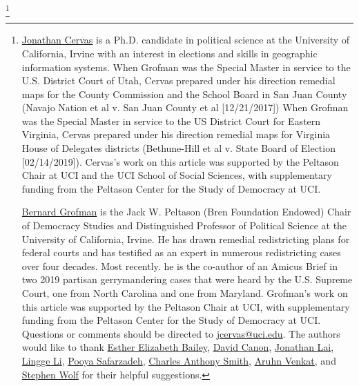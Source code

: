 \documentclass[12pt, a4paper, twoside]{article}
\begin{document}
    \thanks{\href{https://www.jonathancervas.com}{Jonathan Cervas} is a Ph.D. candidate in political science at the University of California, Irvine with an interest in elections and skills in geographic information systems. When Grofman was the Special Master in service to the U.S. District Court of Utah, Cervas prepared under his direction remedial maps for the County Commission and the School Board in San Juan County (Navajo Nation et al v. San Juan County et al [12/21/2017]) When Grofman was the Special Master in service to the US District Court for Eastern Virginia, Cervas prepared under his direction remedial maps for Virginia House of Delegates districts (Bethune-Hill et al v. State Board of Election [02/14/2019]). Cervas’s work on this article was supported by the Peltason Chair at UCI and the UCI School of Social Sciences, with supplementary funding from the Peltason Center for the Study of Democracy at UCI.

    \href{http://www.socsci.uci.edu/~bgrofman/}{Bernard Grofman} is the Jack W. Peltason (Bren Foundation Endowed) Chair of Democracy Studies and Distinguished Professor of Political Science at the University of California, Irvine. He has drawn remedial redistricting plans for federal courts and has testified as an expert in numerous redistricting cases over four decades. Most recently. he is the co-author of an Amicus Brief in two 2019 partisan gerrymandering cases that were heard by the U.S. Supreme Court, one from North Carolina and one from Maryland. Grofman’s work on this article was supported by the Peltason Chair at UCI, with supplementary funding from the Peltason Center for the Study of Democracy at UCI. \\

    Questions or comments should be directed to \url{jcervas@uci.edu}. The authors would like to thank \href{https://www.linkedin.com/in/esther-bailey-9289391a/}{Esther Elizabeth Bailey}, \href{https://polisci.wisc.edu/people/faculty/david-canon}{David Canon}, \href{http://www.philly.com/archive/jonathan_lai/}{Jonathan Lai}, \href{https://github.com/modestbayes}{Lingge Li}, \href{mailto:psafarza@uci.edu}{Pooya Safarzadeh}, \href{https://www.faculty.uci.edu/profile.cfm?faculty_id=5443}{Charles Anthony Smith}, \href{https://twitter.com/aruhnv?lang=en}{Aruhn Venkat}, and \href{https://www.dailykos.com/user/Stephen Wolf}{Stephen Wolf} for their helpful suggestions.}
        \maketitle
\end{document}
